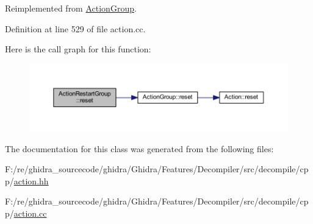 Reimplemented from \mbox{\hyperlink{class_action_group_ae5f0c78e136f9bb5b9bcd6256b8ad097}{Action\+Group}}.



Definition at line 529 of file action.\+cc.

Here is the call graph for this function\+:
\nopagebreak
\begin{figure}[H]
\begin{center}
\leavevmode
\includegraphics[width=350pt]{class_action_restart_group_a8a48151026811fbe97f4aa3eecf67cf0_cgraph}
\end{center}
\end{figure}


The documentation for this class was generated from the following files\+:\begin{DoxyCompactItemize}
\item 
F\+:/re/ghidra\+\_\+sourcecode/ghidra/\+Ghidra/\+Features/\+Decompiler/src/decompile/cpp/\mbox{\hyperlink{action_8hh}{action.\+hh}}\item 
F\+:/re/ghidra\+\_\+sourcecode/ghidra/\+Ghidra/\+Features/\+Decompiler/src/decompile/cpp/\mbox{\hyperlink{action_8cc}{action.\+cc}}\end{DoxyCompactItemize}
